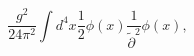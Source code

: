 \begin{equation}
\frac{g^2}{24\pi^2}\int d^4x\frac12\phi(x)
\frac1{\tilde\partial^2}\phi(x),
\end{equation}

